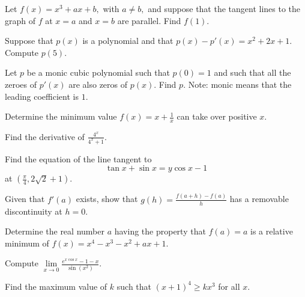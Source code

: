 \documentclass{article}
\begin{document}
\begin{prob}{2}
Let $f(x)=x^3+ax+b,$ with $a\neq b,$ and suppose that the tangent lines to the graph of $f$ at $x=a$ and $x=b$ are parallel. Find $f(1).$
\end{prob}

\begin{prob}{2}
Suppose that $p(x)$ is a polynomial and that $p(x)-p'(x)=x^2+2x+1.$ Compute $p(5).$
\end{prob}

\begin{prob}{3}
Let $p$ be a monic cubic polynomial such that $p(0)=1$ and such that all the zeroes of $p'(x)$ are also zeros of $p(x).$ Find $p.$ Note: monic means that the leading coefficient is $1.$
\end{prob}

\begin{req}{3}
Determine the minimum value $f(x)=x+\frac{1}{x}$ can take over positive $x.$
\end{req}

\begin{prob}[]{3}
Find the derivative of $\frac{4^x}{4^x+1}.$
\end{prob}

\begin{prob}{3}
Find the equation of the line tangent to
\[\tan x+\sin x=y\cos x-1\]
at $(\frac{\pi}{4},2\sqrt{2}+1).$
\end{prob}

\begin{prob}{3}
Given that $f'(a)$ exists, show that $g(h) = \frac{f(a+h) - f(a)}{h}$ has a removable discontinuity at $h = 0$.
\end{prob}

\begin{prob}{3}
Determine the real number $a$ having the property that $f(a)=a$ is a relative minimum of $f(x)=x^4-x^3-x^2+ax+1.$
\end{prob}

\begin{req}{4}
Compute $\lim\limits_{x\to 0}\frac{e^{x\cos x}-1-x}{\sin(x^2)}.$
\end{req}

\begin{prob}{4}
Find the maximum value of $k$ such that $(x+1)^4\geq kx^3$ for all $x.$
\end{prob}
\end{document}
